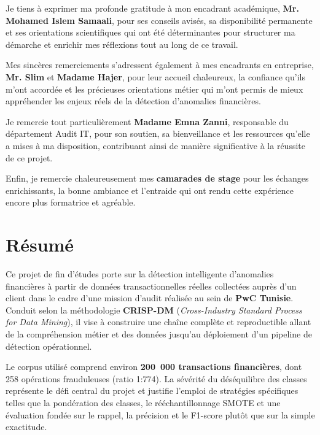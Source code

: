 \documentclass[12pt,a4paper,twoside]{report}
\begin{document}
\medskip

Je tiens à exprimer ma profonde gratitude à mon encadrant académique,
\textbf{Mr. Mohamed Islem Samaali}, pour ses conseils avisés, sa disponibilité permanente
et ses orientations scientifiques qui ont été déterminantes pour structurer ma démarche
et enrichir mes réflexions tout au long de ce travail.

\medskip

Mes sincères remerciements s'adressent également à mes encadrants en entreprise,
\textbf{Mr. Slim} et \textbf{Madame Hajer}, pour leur accueil chaleureux, la confiance
qu'ils m'ont accordée et les précieuses orientations métier qui m'ont permis de mieux
appréhender les enjeux réels de la détection d'anomalies financières.

\medskip

Je remercie tout particulièrement \textbf{Madame Emna Zanni}, responsable du département
Audit IT, pour son soutien, sa bienveillance et les ressources qu'elle a mises à ma
disposition, contribuant ainsi de manière significative à la réussite de ce projet.

\medskip

Enfin, je remercie chaleureusement mes \textbf{camarades de stage} pour les échanges
enrichissants, la bonne ambiance et l'entraide qui ont rendu cette expérience encore plus
formatrice et agréable.

\newpage

\chapter*{Résumé}

Ce projet de fin d'études porte sur la détection intelligente d'anomalies financières à
partir de données transactionnelles réelles collectées auprès d'un client dans le cadre
d'une mission d'audit réalisée au sein de \textbf{PwC Tunisie}. Conduit selon la
méthodologie \textbf{CRISP-DM} (\textit{Cross-Industry Standard Process for Data Mining}),
il vise à construire une chaîne complète et reproductible allant de la compréhension métier
et des données jusqu'au déploiement d'un pipeline de détection opérationnel.

Le corpus utilisé comprend environ \textbf{200~000 transactions financières}, dont
258 opérations frauduleuses (ratio 1:774). La sévérité du déséquilibre des classes
représente le défi central du projet et justifie l'emploi de stratégies spécifiques
telles que la pondération des classes, le rééchantillonnage SMOTE et une évaluation
fondée sur le rappel, la précision et le F1-score plutôt que sur la simple exactitude.
\end{document}
